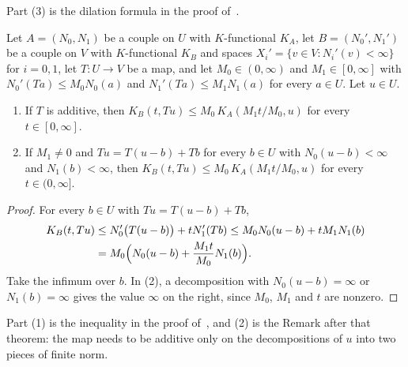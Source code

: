 Part (3) is the dilation formula in the proof of~\cite[Theorem~3.1.2]{BerghLofstrom}.

\begin{lemma}
\label{lem:k-functional-map}
\leanok
{}
Let $A = (N_0, N_1)$ be a couple on $U$ with $K$-functional $K_A$, let $B = (N_0', N_1')$ be a
couple on $V$ with $K$-functional $K_B$ and spaces $X_i' = \{v \in V : N_i'(v) < \infty\}$ for
$i = 0, 1$, let $T : U \to V$ be a map, and let
$M_0 \in (0, \infty)$ and $M_1 \in [0, \infty]$ with $N_0'(Ta) \leq M_0 N_0(a)$ and
$N_1'(Ta) \leq M_1 N_1(a)$ for every $a \in U$. Let $u \in U$.
\begin{enumerate}
  \item If $T$ is additive, then $K_B(t, Tu) \leq M_0 \, K_A(M_1 t / M_0, u)$ for every
    $t \in [0, \infty]$.
  \item If $M_1 \neq 0$ and $Tu = T(u - b) + Tb$ for every $b \in U$ with $N_0(u - b) < \infty$
    and $N_1(b) < \infty$, then $K_B(t, Tu) \leq M_0 \, K_A(M_1 t / M_0, u)$ for every
    $t \in (0, \infty]$.
\end{enumerate}
\end{lemma}

\begin{proof}
\leanok
For every $b \in U$ with $Tu = T(u - b) + Tb$,
\begin{align*}
  K_B(t, Tu) &\leq N_0'\bigl(T(u - b)\bigr) + t N_1'(Tb) \leq M_0 N_0(u - b) + t M_1 N_1(b) \\
  &= M_0 \Bigl(N_0(u - b) + \frac{M_1 t}{M_0} N_1(b)\Bigr) .
\end{align*}
Take the infimum over $b$. In (2), a decomposition with $N_0(u - b) = \infty$ or
$N_1(b) = \infty$ gives the value $\infty$ on the right, since $M_0$, $M_1$ and $t$ are nonzero.
\end{proof}

Part (1) is the inequality in the proof of~\cite[Theorem~3.1.2]{BerghLofstrom}, and (2) is the
Remark after that theorem: the map needs to be additive only on the decompositions of $u$ into
two pieces of finite norm.

